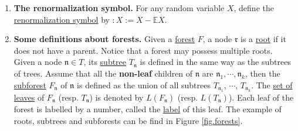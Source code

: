 \begin{defn} \label{def.renorm}
\begin{enumerate}
    \item \textbf{The renormalization symbol.} For any random variable $X$, define the \underline{renormalization symbol} by $:X:=X-\mathbb{E}X$.
    \item \textbf{Some definitions about forests.} Given a \underline{forest} $F$, a node $\mathfrak{r}$ is a \underline{root} if it does not have a parent. Notice that a forest may possess multiple roots. Given a node $\mathfrak{n}\in T$,  its \underline{subtree} $T_{\mathfrak{n}}$ is defined in the same way as the subtrees of trees. Assume that all the \textbf{non-leaf} children of $\mathfrak{n}$ are $\mathfrak{n}_1,\cdots, \mathfrak{n}_k$, then the \underline{subforest} $F_{\mathfrak{n}}$ of $\mathfrak{n}$ is defined as the union of all subtrees $T_{\mathfrak{n}_1}$, $\cdots$, $T_{\mathfrak{n}_k}$. The \underline{set of leaves} of $F_{\mathfrak{n}}$ (resp. $T_{\mathfrak{n}}$) is denoted by $L(F_{\mathfrak{n}})$ (resp. $L(T_{\mathfrak{n}})$). Each leaf of the forest is labelled by a number, called the \underline{label} of this leaf. The example of roots, subtrees and subforests can be find in Figure \ref{fig.forests}.
    \begin{figure}[H]
        \centering
\end{figure}
\end{enumerate}
\end{defn}
